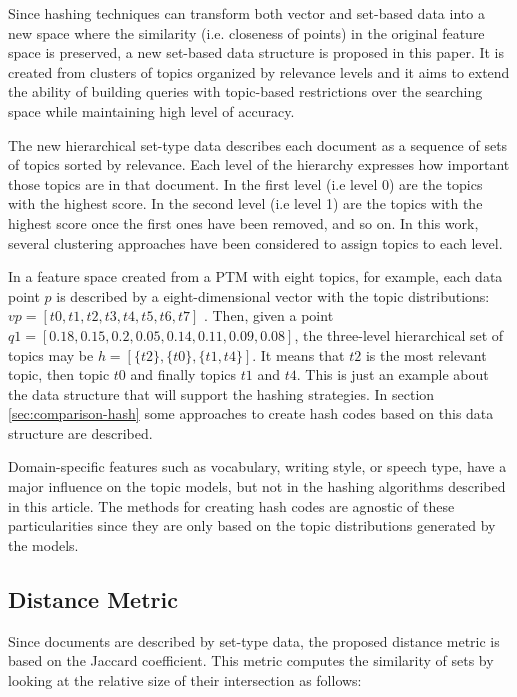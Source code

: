 Since hashing techniques can transform both vector and set-based data \citep{Mao2017, Ji2013} into a new space where the similarity (i.e. closeness of points) in the original feature space is preserved, a new set-based data structure is proposed in this paper. It is created from clusters of topics organized by relevance levels and it aims to extend the ability of building queries with topic-based restrictions over the searching space while maintaining high level of accuracy.

The new hierarchical set-type data describes each document as a sequence of sets of topics sorted by relevance. Each level of the hierarchy expresses how important those topics are in that document. In the first level (i.e level 0) are the topics with the highest score. In the second level (i.e level 1) are the topics with the highest score once the first ones have been removed, and so on. In this work, several clustering approaches have been considered to assign topics to each level.

In a feature space created from a PTM with eight topics, for example, each data point $p$ is described by a eight-dimensional vector with the topic distributions: $vp=[t0,t1,t2,t3,t4,t5,t6,t7]$ . Then, given a point $q1=[0.18, 0.15, 0.2, 0.05, 0.14, 0.11, 0.09, 0.08]$, the three-level hierarchical set of topics may be $h=[\{t2\},\{t0\},\{t1,t4\}]$. It means that $t2$ is the most relevant topic, then topic $t0$ and finally topics $t1$ and $t4$. This is just an example about the data structure that will support the hashing strategies. In section \ref{sec:comparison-hash} some approaches to create hash codes based on this data structure are described.

Domain-specific features such as vocabulary, writing style, or speech type, have a major influence on the topic models, but not in the hashing algorithms described in this article. The methods for creating hash codes are agnostic of these particularities since they are only based on the topic distributions generated by the models. 

\subsection{Distance Metric}
\label{sec:large-distance-metric}
Since documents are described by set-type data, the proposed distance metric is based on the Jaccard coefficient. This metric computes the similarity of sets by looking at the relative size of their intersection as follows:

